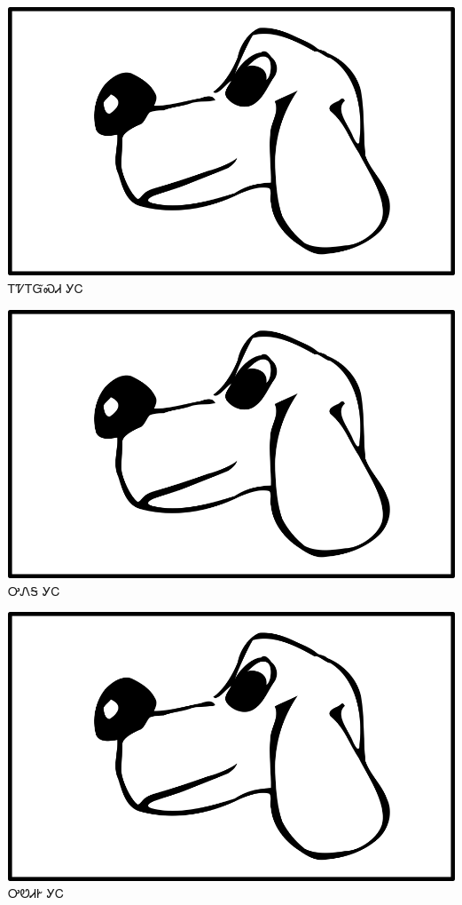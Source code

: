 \documentclass[avery5371]{flashcards}%
\begin{document}
    \begin{flashcard}{
        \includegraphics[width=0.95\columnwidth,height=.51\columnwidth,keepaspectratio]{../artwork/for-colors/gihli}
    }
        \Huge ᎢᏤᎢᏳᏍᏗ ᎩᏟ
    \end{flashcard}

    \begin{flashcard}{
        \includegraphics[width=0.95\columnwidth,height=.51\columnwidth,keepaspectratio]{../artwork/for-colors/gihli}
    }
        \Huge ᎤᏁᎦ ᎩᏟ
    \end{flashcard}

    \begin{flashcard}{
        \includegraphics[width=0.95\columnwidth,height=.51\columnwidth,keepaspectratio]{../artwork/for-colors/gihli}
    }
        \Huge ᎤᏬᏗᎨ ᎩᏟ
    \end{flashcard}
\end{document}
